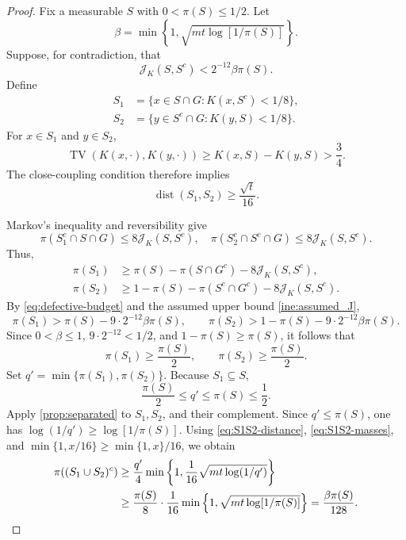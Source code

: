 \documentclass[11pt]{article}
\newcommand{\TV}{\operatorname{TV}}
\newcommand{\1}{\mathbf 1}
\begin{document}
	\begin{proof}
		Fix a measurable \(S\) with \(0<\pi(S)\leq1/2\).  Let
		\[
		\beta=\min\left\{1,\sqrt{mt\log[1/\pi(S)]}\right\}.
		\]
		Suppose, for contradiction, that
		\begin{equation} \label{ine:assumed_J}
			\mathcal{J}_K(S,S^c)< 2^{-12}  \beta \pi(S).
		\end{equation}
		Define
		\[
		\begin{aligned}
			S_1&=\{x\in S\cap G:K(x,S^c)< 1/8 \},\\
			S_2&=\{y\in S^c\cap G:K(y,S)< 1/8 \}.
		\end{aligned}
		\]
		For \(x\in S_1\) and \(y\in S_2\),
		\[
		\TV(K(x,\cdot),K(y,\cdot))
		\geq K(x,S)-K(y,S)> \frac34 .
		\]
		The close-coupling condition therefore implies
		\begin{equation}\label{eq:S1S2-distance}
			\operatorname{dist}(S_1,S_2)\geq\frac{\sqrt{t}}{16}.
		\end{equation}
		
		Markov's inequality and reversibility give
		\begin{equation} \label{ine:Markov}
			\pi(S_1^c \cap S \cap G) \leq 8 \mathcal{J}_K(S,S^c), \quad \pi(S_2^c \cap S^c \cap G) \leq 8 \mathcal{J}_K(S,S^c).
		\end{equation}
		Thus,
		\[
		\begin{aligned}
			\pi(S_1)
			&\geq \pi(S)-\pi(S\cap G^c)-8\mathcal{J}_K(S,S^c),\\
			\pi(S_2)
			&\geq1-\pi(S)-\pi(S^c\cap G^c)-8\mathcal{J}_K(S,S^c).
		\end{aligned}
		\]
		By \eqref{eq:defective-budget} and the assumed upper bound \eqref{ine:assumed_J},
		\[
		\pi(S_1)
		>\pi(S)- 9\cdot2^{-12}  \beta \pi(S),
		\qquad
		\pi(S_2)
		>1-\pi(S)- 9\cdot2^{-12}  \beta \pi(S).
		\]
		Since \(0<\beta\leq1\), \( 9\cdot2^{-12} <1/2\), and
		\(1-\pi(S) \geq \pi(S)\), it follows that
		\begin{equation}\label{eq:S1S2-masses}
			\pi(S_1)\geq\frac{\pi(S)}{2},
			\qquad
			\pi(S_2)\geq\frac{\pi(S)}{2}.
		\end{equation}
		Set
		\(q'=\min\{\pi(S_1),\pi(S_2)\}\).  Because \(S_1\subseteq S\),
		\[
		\frac{\pi(S)}{2}\leq q'\leq \pi(S) \leq\frac12.
		\]
		Apply \cref{prop:separated} to \(S_1,S_2\), and their complement.  Since
		\(q'\leq \pi(S)\), one has \(\log(1/q')\geq\log[1/\pi(S)]\).  Using
		\eqref{eq:S1S2-distance}, \eqref{eq:S1S2-masses}, and
		\(\min\{1,x/16\}\geq\min\{1,x\}/16\), we obtain
		\begin{align}
			\pi((S_1\cup S_2)^c)
			&\geq\frac{q'}4
			\min\left\{1,\frac1{16}\sqrt{mt\log(1/q')}\right\}\notag\\
			&\geq\frac{\pi(S)}{8}\cdot\frac1{16}
			\min\left\{1,\sqrt{mt\log[1/\pi(S)]}\right\}
			=\frac{\beta \pi(S)}{128}.
			\label{eq:defective-lower-complement}
		\end{align}
		

\end{proof}
\end{document}
